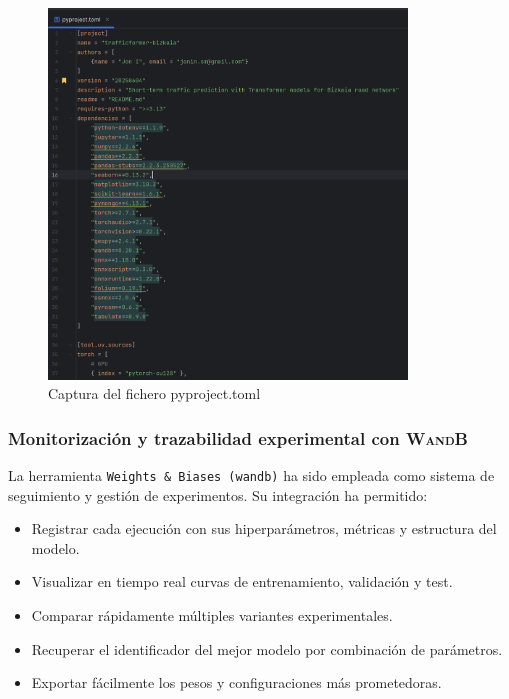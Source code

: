 \begin{figure}[H]
	\centering
	\includegraphics[width=0.85\textwidth]{includes/cap5/captura_pyproject_toml.png}
	\caption{Captura del fichero pyproject.toml}
	\label{fig:capt_pyproject}
\end{figure}

\subsubsection{Monitorización y trazabilidad experimental con W\textsc{and}B}

La herramienta \texttt{Weights \& Biases (wandb)} ha sido empleada como sistema de seguimiento y gestión de experimentos. Su integración ha permitido:

\begin{itemize}
	\item Registrar cada ejecución con sus hiperparámetros, métricas y estructura del modelo.
	\item Visualizar en tiempo real curvas de entrenamiento, validación y test.
	\item Comparar rápidamente múltiples variantes experimentales.
	\item Recuperar el identificador del mejor modelo por combinación de parámetros.
	\item Exportar fácilmente los pesos y configuraciones más prometedoras.
\end{itemize}

